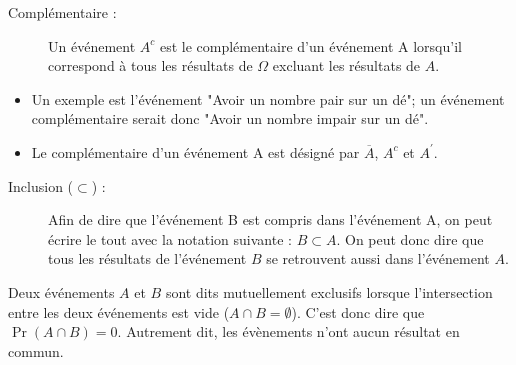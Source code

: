 \documentclass[10pt, french]{article}
\def\firstrectangle{(0,0) rectangle (7, 4)}
\def\firstcircle{(2.5,2) circle (1.5cm)}
\def\secondcircle{(4.5, 2) circle (1.5cm)}
\begin{document}
\begin{multicols*}{2}
\begin{center}
\end{center}
\begin{description} 
 \item[Complémentaire :] Un événement $A^{c}$ est le complémentaire d'un événement A lorsqu'il correspond à tous les résultats de $\Omega$ excluant les résultats de $A$. 
\end{description}
\begin{itemize}
  	\item	Un exemple est l'événement "Avoir un nombre pair sur un dé"; un événement complémentaire serait donc "Avoir un nombre impair sur un dé".
  	\item   Le complémentaire d'un événement A est désigné par {$\overline{A}$}, $A^{c}$ et $A^{'}$.
\end{itemize}
\begin{center}
\end{center}
\pagebreak
\begin{description} 
 \item[Inclusion ($\subset$) :] Afin de dire que l'événement B est compris dans l'événement A, on peut écrire le tout avec la notation suivante : $B \subset A$. On peut donc dire que tous les résultats de l'événement $B$ se retrouvent aussi dans l'événement $A$.
\end{description}
\begin{center}
\end{center}

\begin{definitionNOHFILL}
Deux événements $A$ et $B$ sont dits mutuellement exclusifs lorsque l'intersection entre les deux événements est vide ($A \cap B = \emptyset$). C'est donc dire que $\Pr(A \cap B) = 0$. Autrement dit, les évènements n'ont aucun résultat en commun.
\end{definitionNOHFILL}


\end{multicols*}
\end{document}
